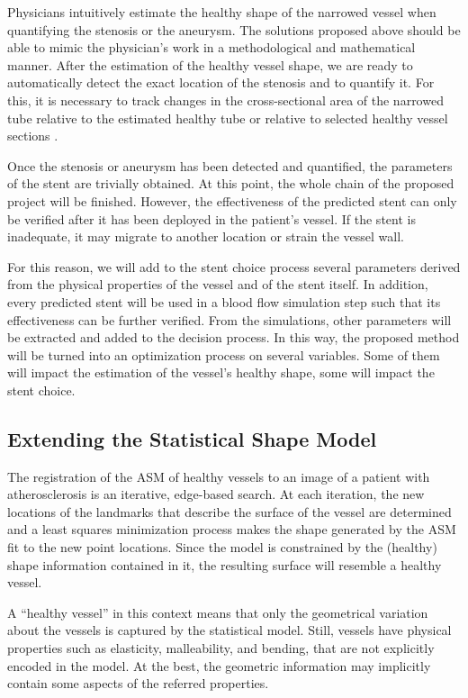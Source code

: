Physicians intuitively estimate the healthy shape of the narrowed vessel when quantifying the stenosis or the aneurysm. The solutions proposed above should be able to mimic the physician's work in a methodological and mathematical manner. After the estimation of the healthy vessel shape, we are ready to automatically detect the exact location of the stenosis and to quantify it. For this, it is necessary to track changes in the cross-sectional area of the narrowed tube relative to the estimated healthy tube \citep{Pinho:Trachea4} or relative to selected healthy vessel sections \citep{Florez2,Bemmel}.

Once the stenosis or aneurysm has been detected and quantified, the parameters of the stent are trivially obtained. At this point, the whole chain of the proposed project will be finished. However, the effectiveness of the predicted stent can only be verified after it has been deployed in the patient's vessel. If the stent is inadequate, it may migrate to another location or strain the vessel wall. 

For this reason, we will add to the stent choice process several parameters derived from the physical properties of the vessel and of the stent itself. In addition, every predicted stent will be used in a blood flow simulation step such that its effectiveness can be further verified. From the simulations, other parameters will be extracted and added to the decision process. In this way, the proposed method will be turned into an optimization process on several variables. Some of them will impact the estimation of the vessel's healthy shape, some will impact the stent choice.

\subsection{Extending the Statistical Shape Model}

\challenge
The registration of the ASM of healthy vessels to an image of a patient with atherosclerosis is an iterative, edge-based search. At each iteration, the new locations of the landmarks that describe the surface of the vessel are determined and a least squares minimization process makes the shape generated by the ASM fit to the new point locations. Since the model is constrained by the (healthy) shape information contained in it, the resulting surface will resemble a healthy vessel.

A ``healthy vessel'' in this context means that only the geometrical variation about the vessels is captured by the statistical model. Still, vessels have physical properties such as elasticity, malleability, and bending, that are not explicitly encoded in the model. At the best, the geometric information may implicitly contain some aspects of the referred properties. 

